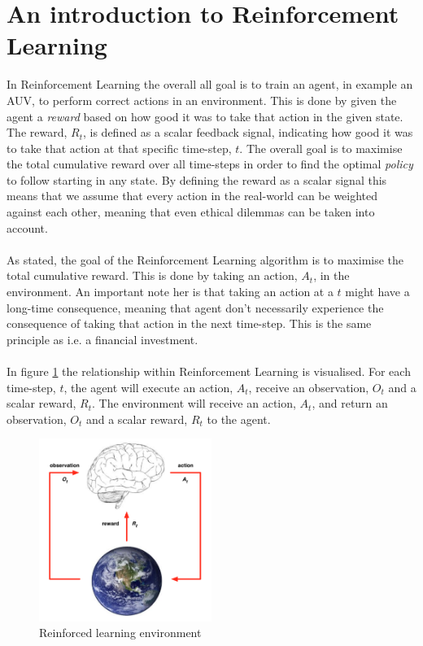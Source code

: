 \section{An introduction to Reinforcement Learning}
In Reinforcement Learning the overall all goal is to train an agent, in example an AUV, to perform correct actions in an environment. This is done by given the agent a \textit{reward} based on how good it was to take that action in the given state. The reward, $R_{t}$, is defined as a scalar feedback signal, indicating how good it was to take that action at that specific time-step, $t$. The overall goal is to maximise the total cumulative reward over all time-steps in order to find the optimal \textit{policy} to follow starting in any state. By defining the reward as a scalar signal this means that we assume that every action in the real-world can be weighted against each other, meaning that even ethical dilemmas can be taken into account.\\\\
As stated, the goal of the Reinforcement Learning algorithm is to maximise the total cumulative reward. This is done by taking an action, $A_{t}$, in the environment. An important note her is that taking an action at a $t$ might have a long-time consequence, meaning that agent don't necessarily experience the consequence of taking that action in the next time-step. This is the same principle as i.e. a financial investment.\\\\
In figure \ref{fig:environment} the relationship within Reinforcement Learning is visualised. For each time-step, $t$, the agent will execute an action, $A_{t}$, receive an observation, $O_{t}$ and a scalar reward, $R_{t}$. The environment will receive an action, $A_{t}$, and return an observation, $O_{t}$ and a scalar reward, $R_{t}$ to the agent. 
\begin{figure}[H]
    \centering
    \includegraphics[width=0.5\textwidth]{images/chap2/Agent_environment.png}
    \caption{Reinforced learning environment \cite{Silver}}
    \label{fig:environment}
\end{figure}
